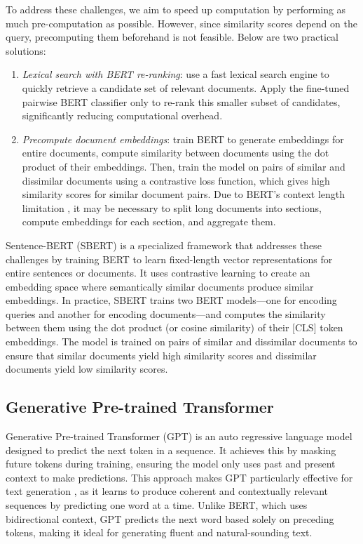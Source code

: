 To address these challenges, we aim to speed up computation by performing as much pre-computation as possible. 
However, since similarity scores depend on the query, precomputing them beforehand is not feasible. 
Below are two practical solutions:
\begin{enumerate}
    \item \textit{Lexical search with BERT re-ranking}: use a fast lexical search engine to quickly retrieve a candidate set of relevant documents.
        Apply the fine-tuned pairwise BERT classifier only to re-rank this smaller subset of candidates, significantly reducing computational overhead.
    \item \textit{Precompute document embeddings}: train BERT to generate embeddings for entire documents, compute similarity between documents using the dot product of their embeddings.
        Then, train the model on pairs of similar and dissimilar documents using a contrastive loss function, which gives high similarity scores for similar document pairs.
        Due to BERT's context length limitation , it may be necessary to split long documents into sections, compute embeddings for each section, and aggregate them.
\end{enumerate}
Sentence-BERT (SBERT) is a specialized framework that addresses these challenges by training BERT to learn fixed-length vector representations for entire sentences or documents.
It uses contrastive learning to create an embedding space where semantically similar documents produce similar embeddings.
In practice, SBERT trains two BERT models—one for encoding queries and another for encoding documents—and computes the similarity between them using the dot product (or cosine similarity) of their [CLS] token embeddings.
The model is trained on pairs of similar and dissimilar documents to ensure that similar documents yield high similarity scores and dissimilar documents yield low similarity scores.

\subsection{Generative Pre-trained Transformer}
Generative Pre-trained Transformer (GPT) is an auto regressive language model designed to predict the next token in a sequence. 
It achieves this by masking future tokens during training, ensuring the model only uses past and present context to make predictions.
This approach makes GPT particularly effective for text generation , as it learns to produce coherent and contextually relevant sequences by predicting one word at a time.
Unlike BERT, which uses bidirectional context, GPT predicts the next word based solely on preceding tokens, making it ideal for generating fluent and natural-sounding text.

